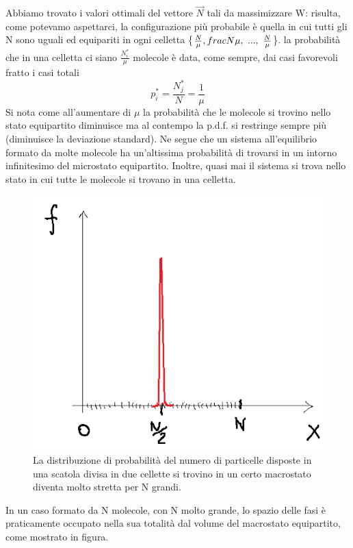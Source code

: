 \documentclass[10pt,a4paper]{article}
\begin{document}
Abbiamo trovato i valori ottimali del vettore $\vec{N}$ tali da massimizzare W: risulta, come potevamo aspettarci, la configurazione più probabile è quella in cui tutti gli N sono uguali ed equipariti in ogni celletta \{$\frac{N}{\mu},\\frac{N}{\mu},\ ...,\ \frac{N}{\mu} $\}. la probabilità che in una celletta ci siano $\frac{N_i^*}{\mu}$ molecole è data, come sempre, dai casi favorevoli fratto i casi totali
\[p_i^*=\frac{N_j^*}{N}=\frac{1}{\mu}\]
Si nota come all'aumentare di $\mu$ la probabilità che le molecole si trovino nello stato equipartito diminuisce ma al contempo la p.d.f. si restringe sempre più (diminuisce la deviazione standard). Ne segue che un sistema all'equilibrio formato da molte molecole ha un'altissima probabilità di trovarsi in un intorno infinitesimo del microstato equipartito. Inoltre, quasi mai il sistema si trova nello stato in cui tutte le molecole si trovano in una celletta. 

\begin{figure}[h!]
	\centering
	\includegraphics[width=0.4\linewidth]{"../images/caso ad N"}
	\caption{La distribuzione di probabilità del numero di particelle disposte in una scatola divisa in due cellette si trovino in un certo macrostato diventa molto stretta per N grandi.}
	\label{fig:caso-ad-n}
\end{figure}
\FloatBarrier
In un caso formato da N molecole, con N molto grande, lo spazio delle fasi è praticamente occupato nella sua totalità dal volume del macrostato equipartito, come mostrato in figura. 
 
\end{document}
